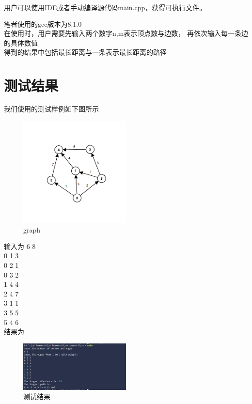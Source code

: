 用户可以使用IDE或者手动编译源代码main.cpp，获得可执行文件。

笔者使用的gcc版本为8.1.0\\
在使用时，用户需要先输入两个数字n,m表示顶点数与边数，
再依次输入每一条边的具体数值\\
得到的结果中包括最长距离与一条表示最长距离的路径
\section{测试结果}

我们使用的测试样例如下图所示
\begin{figure}[H]
	\centering
	\includegraphics[width=0.5\textwidth]{images/graph.png}
	\caption{graph}
\end{figure}

输入为
6 8 \\
0 1 3 \\
0 2 1 \\
0 3 2 \\
1 4 4 \\
2 4 7 \\
3 1 1 \\
3 5 5 \\
5 4 6 \\


结果为
\begin{figure}[H]
	\centering
	\includegraphics[width=0.5\textwidth]{images/example.png}
	\caption{测试结果}
\end{figure}
